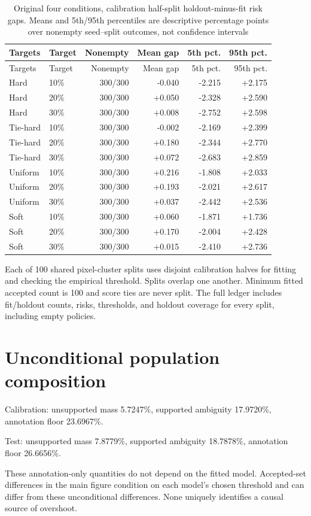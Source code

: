 \documentclass[10pt]{article}
\begin{document}
\begin{longtable}{llrrrr}
\caption{Original four conditions, calibration half-split holdout-minus-fit risk gaps. Means and 5th/95th percentiles are descriptive percentage points over nonempty seed--split outcomes, not confidence intervals}\\
\toprule Targets & Target & Nonempty & Mean gap & 5th pct. & 95th pct.\\\midrule\endfirsthead
\toprule Targets & Target & Nonempty & Mean gap & 5th pct. & 95th pct.\\\midrule\endhead
Hard & 10\% & 300/300 & -0.040 & -2.215 & +2.175\\
Hard & 20\% & 300/300 & +0.050 & -2.328 & +2.590\\
Hard & 30\% & 300/300 & +0.008 & -2.752 & +2.598\\
Tie-hard & 10\% & 300/300 & -0.002 & -2.169 & +2.399\\
Tie-hard & 20\% & 300/300 & +0.180 & -2.344 & +2.770\\
Tie-hard & 30\% & 300/300 & +0.072 & -2.683 & +2.859\\
Uniform & 10\% & 300/300 & +0.216 & -1.808 & +2.033\\
Uniform & 20\% & 300/300 & +0.193 & -2.021 & +2.617\\
Uniform & 30\% & 300/300 & +0.037 & -2.442 & +2.536\\
Soft & 10\% & 300/300 & +0.060 & -1.871 & +1.736\\
Soft & 20\% & 300/300 & +0.170 & -2.004 & +2.428\\
Soft & 30\% & 300/300 & +0.015 & -2.410 & +2.736\\
\bottomrule\end{longtable}
Each of 100 shared pixel-cluster splits uses disjoint calibration halves for fitting and checking the empirical threshold. Splits overlap one another. Minimum fitted accepted count is 100 and score ties are never split. The full ledger includes fit/holdout counts, risks, thresholds, and holdout coverage for every split, including empty policies.
\section*{Unconditional population composition}
Calibration: unsupported mass 5.7247\%, supported ambiguity 17.9720\%, annotation floor 23.6967\%.\par
Test: unsupported mass 7.8779\%, supported ambiguity 18.7878\%, annotation floor 26.6656\%.\par
These annotation-only quantities do not depend on the fitted model. Accepted-set differences in the main figure condition on each model's chosen threshold and can differ from these unconditional differences. None uniquely identifies a causal source of overshoot.
\end{document}
